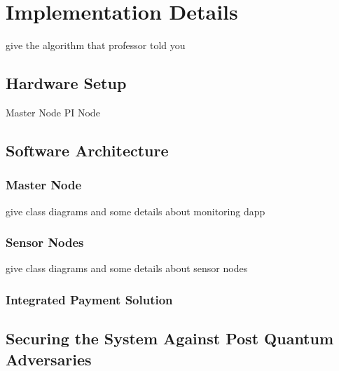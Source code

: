 \section{Implementation Details}
give the algorithm that professor told you
\subsection{Hardware Setup}
Master Node
PI Node
\subsection{Software Architecture}
\subsubsection{Master Node}
give class diagrams and some details about monitoring dapp

\subsubsection{Sensor Nodes}
give class diagrams and some details about sensor nodes
\subsubsection{Integrated Payment Solution}

\subsection{Securing the System Against Post Quantum Adversaries}